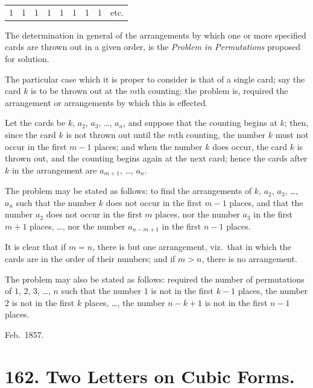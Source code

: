 \documentclass[11pt,a4paper]{book}
\begin{document}
\begin{center}
\begin{tabular}{ccccccccc}
1 & 1 & 1 & 1 & 1 & 1 & 1 & 1 & etc.
\end{tabular}
\end{center}

The determination in general of the arrangements by which one or more specified cards are thrown out in a given order, is the \textit{Problem in Permutations} proposed for solution.

The particular case which it is proper to consider is that of a single card; say the card $k$ is to be thrown out at the $m$th counting; the problem is, required the arrangement or arrangements by which this is effected.

Let the cards be $k$, $a_2$, $a_3$, \ldots, $a_n$, and suppose that the counting begins at $k$; then, since the card $k$ is not thrown out until the $m$th counting, the number $k$ must not occur in the first $m-1$ places; and when the number $k$ does occur, the card $k$ is thrown out, and the counting begins again at the next card; hence the cards after $k$ in the arrangement are $a_{m+1}$, \ldots, $a_n$.

The problem may be stated as follows: to find the arrangements of $k$, $a_2$, $a_3$, \ldots, $a_n$ such that the number $k$ does not occur in the first $m-1$ places, and that the number $a_2$ does not occur in the first $m$ places, nor the number $a_3$ in the first $m+1$ places, \ldots, nor the number $a_{n-m+1}$ in the first $n-1$ places.

It is clear that if $m=n$, there is but one arrangement, viz.\ that in which the cards are in the order of their numbers; and if $m>n$, there is no arrangement.

The problem may also be stated as follows: required the number of permutations of $1$, $2$, $3$, \ldots, $n$ such that the number $1$ is not in the first $k-1$ places, the number $2$ is not in the first $k$ places, \ldots, the number $n-k+1$ is not in the first $n-1$ places.

\begin{flushright}
Feb.~1857.
\end{flushright}

\clearpage

\section*{162. Two Letters on Cubic Forms.}
\end{document}
